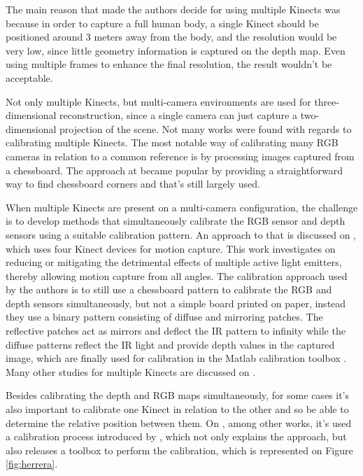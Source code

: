 \documentclass[msc, a4paper, classic, en]{ufbathesis}
\begin{document}
The main reason that made the authors decide for using multiple Kinects was because in order to capture a full human body, a single Kinect should be positioned around 3 meters away from the body, and the resolution would be very low, since little geometry information is captured on the depth map. Even using multiple frames to enhance the final resolution, the result wouldn't be acceptable.

Not only multiple Kinects, but multi-camera environments are used for three-dimensional reconstruction, since a single camera can just capture a two-dimensional projection of the scene. Not many works were found with regards to calibrating multiple Kinects. The most notable way of calibrating many RGB cameras in relation to a common reference is by processing images captured from a chessboard. The approach at \cite{matlab} became popular by providing a straightforward way to find chessboard corners and that's still largely used.

When multiple Kinects are present on a multi-camera configuration, the challenge is to develop methods that simultaneously calibrate the RGB sensor and depth sensors using a suitable calibration pattern. An approach to that is discussed on \cite{berger2011markerless}, which uses four Kinect devices for motion capture. This work investigates on reducing or mitigating the detrimental effects of multiple active light emitters, thereby allowing motion capture from all angles. The calibration approach used by the authors is to still use a chessboard pattern to calibrate the RGB and depth sensors simultaneously, but not a simple board printed on paper, instead they use a binary pattern consisting of diffuse and mirroring patches. The reflective patches act as mirrors and deflect the IR pattern to infinity while the diffuse patterns reflect the IR light and provide depth values in the captured image, which are finally used for calibration in the Matlab calibration toolbox \cite{matlab}. Many other studies for multiple Kinects are discussed on \cite{schroder2011multiple}.

Besides calibrating the depth and RGB maps simultaneously, for some cases it's also important to calibrate one Kinect in relation to the other and so be able to determine the relative position between them. On \cite{magnus2013}, among other works, it's used a calibration process introduced by \cite{herrera}, which not only explains the approach, but also releases a toolbox to perform the calibration, which is represented on Figure \ref{fig:herrera}.
\end{document}
